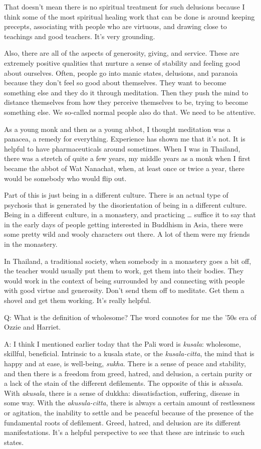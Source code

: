 That doesn’t mean there is no spiritual treatment for such delusions
because I think some of the most spiritual healing work that can be done
is around keeping precepts, associating with people who are virtuous,
and drawing close to teachings and good teachers. It’s very grounding.

Also, there are all of the aspects of generosity, giving, and service.
These are extremely positive qualities that nurture a sense of stability
and feeling good about ourselves. Often, people go into manic states,
delusions, and paranoia because they don’t feel so good about
themselves. They want to become something else and they do it through
meditation. Then they push the mind to distance themselves from how they
perceive themselves to be, trying to become something else. We so-called
normal people also do that. We need to be attentive.

As a young monk and then as a young abbot, I thought meditation was a
panacea, a remedy for everything. Experience has shown me that it’s not.
It is helpful to have pharmaceuticals around sometimes. When I was in
Thailand, there was a stretch of quite a few years, my middle years as a
monk when I first became the abbot of Wat Nanachat, when, at least once
or twice a year, there would be somebody who would flip out.

Part of this is just being in a different culture. There is an actual
type of psychosis that is generated by the disorientation of being in a
different culture. Being in a different culture, in a monastery, and
practicing \ldots{} suffice it to say that in the early days of people
getting interested in Buddhism in Asia, there were some pretty wild and
wooly characters out there. A lot of them were my friends in the
monastery.

In Thailand, a traditional society, when somebody in a monastery goes a
bit off, the teacher would usually put them to work, get them into their
bodies. They would work in the context of being surrounded by and
connecting with people with good virtue and generosity. Don’t send them
off to meditate. Get them a shovel and get them working. It’s really
helpful.

\qaspace
Q: What is the definition of wholesome? The word connotes for me the
’50s era of Ozzie and Harriet.

\qaspace
A: I think I mentioned earlier today that the Pali word is
\emph{kusala}: wholesome, skillful, beneficial. Intrinsic to a kusala
state, or the \emph{kusala-citta}, the mind that is happy and at ease,
is well-being, \emph{sukha}. There is a sense of peace and stability,
and then there is a freedom from greed, hatred, and delusion, a certain
purity or a lack of the stain of the different defilements. The opposite
of this is \emph{akusala}. With \emph{akusala}, there is a sense of
dukkha: dissatisfaction, suffering, disease in some way. With the
\emph{akusula-citta}, there is always a certain amount of restlessness
or agitation, the inability to settle and be peaceful because of the
presence of the fundamental roots of defilement. Greed, hatred, and
delusion are its different manifestations. It’s a helpful perspective to
see that these are intrinsic to such states.

